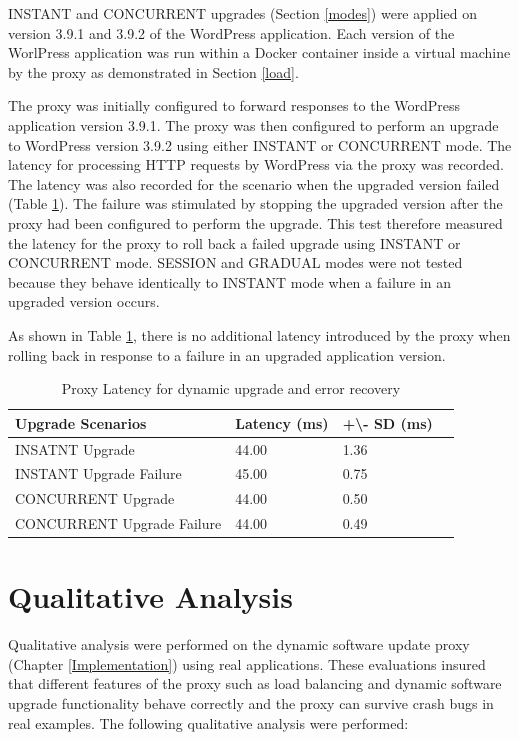\documentclass[a4paper,11pt,twoside]{report}
\begin{document}
INSTANT and CONCURRENT upgrades (Section \ref{modes}) were applied on version 3.9.1 and 3.9.2 of the WordPress application. Each version of the WorlPress application was run within a Docker container inside a virtual machine by the proxy as demonstrated in Section \ref{load}.    

The proxy was initially configured to forward responses to the WordPress application version 3.9.1. The proxy was then configured to perform an upgrade to WordPress version 3.9.2 using either INSTANT or CONCURRENT mode. The latency for processing HTTP requests by WordPress via the proxy was recorded. The latency was also recorded for the scenario when the upgraded version failed (Table \ref{upgrade-speed}). The failure was stimulated by stopping the upgraded version after the proxy had been configured to perform the upgrade. This test therefore measured the latency for the proxy to roll back a failed upgrade using INSTANT or CONCURRENT mode. SESSION and GRADUAL modes were not tested because they behave identically to INSTANT mode when a failure in an upgraded version occurs.

As shown in Table  {\ref{upgrade-speed}}, there is no additional latency introduced by the proxy when rolling back in response to a failure in an upgraded application version. 
 
\begin{table}
\caption {Proxy Latency for dynamic upgrade and error recovery}
\label{upgrade-speed}
\begin{center}
    \begin{tabular}{ | l | l | l | p{5cm} |}
    \hline
   \textbf{Upgrade Scenarios} & \textbf{Latency (ms)} & \textbf{+\textbackslash }\textbf{- SD (ms)} \\ \hline
    INSATNT Upgrade & 44.00 &1.36 \\ \hline
    INSTANT Upgrade Failure & 45.00 & 0.75\\ \hline
    CONCURRENT Upgrade & 44.00 & 0.50\\ \hline
    CONCURRENT Upgrade Failure & 44.00 & 0.49\\
    \hline
    \end{tabular}
\end{center}
\end{table}

\section{Qualitative Analysis}
Qualitative analysis were performed on the dynamic software update proxy (Chapter \ref{Implementation})  using real applications. These evaluations insured that different features of the proxy such as load balancing and dynamic software upgrade functionality behave correctly and the proxy can survive crash bugs in real examples. The following qualitative analysis were performed: 
\end{document}
